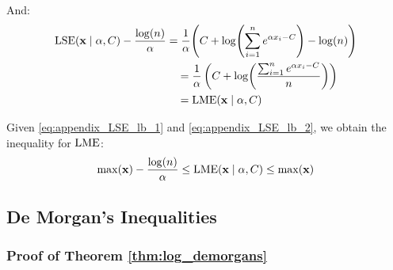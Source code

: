 And:
\begin{align}
    \operatorname{LSE}(\mathbf{x} \mid \alpha, C) - \frac{\log(n)}{\alpha} &= \frac{1}{\alpha} \Bigg( C + \log(\sum_{i=1}^n e^{\alpha x_i - C}) - \log(n)\Bigg) \\
            & \quad = \frac{1}{\alpha} \left( C + \log(\frac{\sum_{i=1}^n e^{\alpha x_i-C}}{n} ) \right) \\
   \label{eq:appendix_LSE_lb_2}         & \quad = \operatorname{LME}(\mathbf{x} \mid \alpha, C)
\end{align} 

Given \eqref{eq:appendix_LSE_lb_1} and \eqref{eq:appendix_LSE_lb_2}, we obtain the inequality for $\operatorname{LME}$:
\begin{equation}
    \max(\mathbf{x}) - \frac{\log(n)}{\alpha} \leq \operatorname{LME}(\mathbf{x} \mid \alpha, C) \leq \max(\mathbf{x})
\end{equation}



\subsection{De Morgan's Inequalities}
\subsubsection{Proof of Theorem \ref{thm:log_demorgans}}
\label{appendix:proof_nnfdemorgans}
\logdemorgans*

